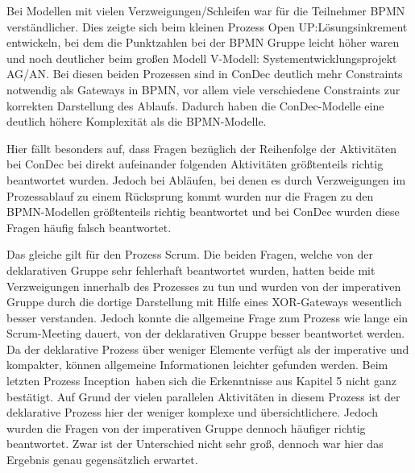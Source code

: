 Bei Modellen mit  vielen Verzweigungen/Schleifen war für die Teilnehmer BPMN verständlicher. Dies zeigte sich beim kleinen Prozess \grqq Open UP:Lösungsinkrement entwickeln\grqq, bei dem die Punktzahlen bei der BPMN Gruppe leicht höher waren und noch deutlicher beim großen Modell \grqq V-Modell: Systementwicklungsprojekt AG/AN\grqq. Bei diesen beiden Prozessen sind in ConDec deutlich mehr Constraints notwendig als Gateways in BPMN, vor allem viele verschiedene Constraints zur korrekten Darstellung des Ablaufs. Dadurch haben die ConDec-Modelle eine deutlich höhere Komplexität als die BPMN-Modelle.\newline

Hier fällt besonders auf, dass Fragen bezüglich der Reihenfolge der Aktivitäten bei ConDec bei direkt aufeinander folgenden Aktivitäten größtenteils richtig beantwortet wurden. Jedoch bei Abläufen, bei denen es durch Verzweigungen im Prozessablauf zu einem Rücksprung kommt wurden nur die Fragen zu den BPMN-Modellen größtenteils richtig beantwortet und bei ConDec wurden diese Fragen häufig falsch beantwortet.\newline

Das gleiche gilt für den Prozess \grqq Scrum\grqq. Die beiden Fragen, welche von der deklarativen Gruppe sehr fehlerhaft beantwortet wurden, hatten beide mit Verzweigungen innerhalb des Prozesses zu tun und wurden von der imperativen Gruppe durch die dortige Darstellung mit Hilfe eines XOR-Gateways wesentlich besser verstanden. Jedoch konnte die allgemeine Frage zum Prozess wie lange ein Scrum-Meeting dauert, von der deklarativen Gruppe besser beantwortet werden. Da der deklarative Prozess über weniger Elemente verfügt als der imperative und kompakter, können allgemeine Informationen leichter gefunden werden. \newline
Beim letzten Prozess \grqq Inception\grqq \ haben sich die Erkenntnisse aus Kapitel 5 nicht ganz bestätigt. Auf Grund der vielen parallelen Aktivitäten in diesem Prozess ist der deklarative Prozess hier der weniger komplexe und übersichtlichere. Jedoch wurden die Fragen von der imperativen Gruppe dennoch häufiger richtig beantwortet. Zwar ist der Unterschied nicht sehr groß, dennoch war hier das Ergebnis genau gegensätzlich erwartet.\newline

